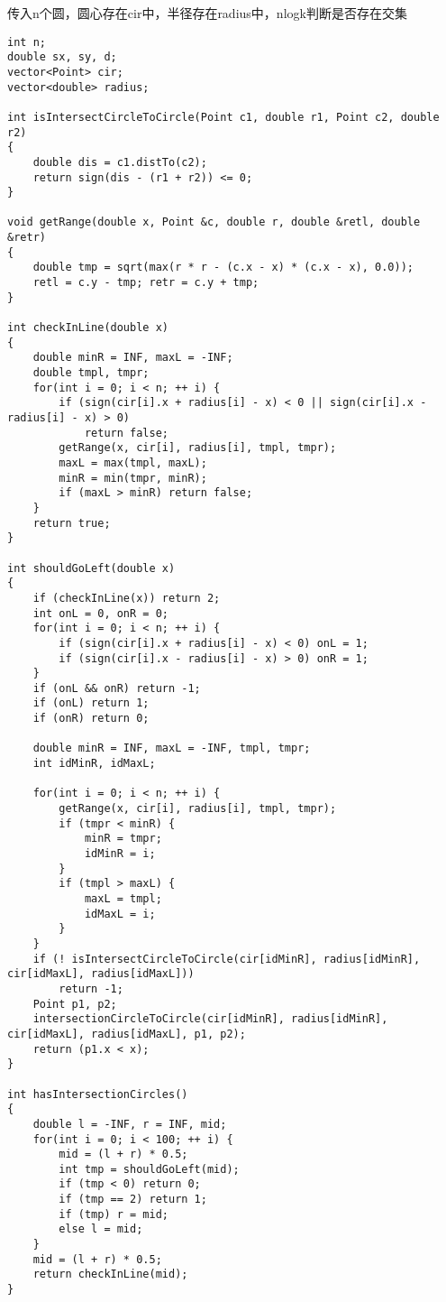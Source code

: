 传入n个圆，圆心存在cir中，半径存在radius中，nlogk判断是否存在交集
\begin{lstlisting}
int n;
double sx, sy, d;
vector<Point> cir;
vector<double> radius;

int isIntersectCircleToCircle(Point c1, double r1, Point c2, double r2)
{
	double dis = c1.distTo(c2);
	return sign(dis - (r1 + r2)) <= 0;
}

void getRange(double x, Point &c, double r, double &retl, double &retr)
{
	double tmp = sqrt(max(r * r - (c.x - x) * (c.x - x), 0.0));
	retl = c.y - tmp; retr = c.y + tmp;
}

int checkInLine(double x)
{
	double minR = INF, maxL = -INF;
	double tmpl, tmpr;
	for(int i = 0; i < n; ++ i) {
		if (sign(cir[i].x + radius[i] - x) < 0 || sign(cir[i].x - radius[i] - x) > 0) 
			return false;
		getRange(x, cir[i], radius[i], tmpl, tmpr);
		maxL = max(tmpl, maxL);
		minR = min(tmpr, minR);
		if (maxL > minR) return false;
	}
	return true;
}

int shouldGoLeft(double x)
{
	if (checkInLine(x)) return 2;
	int onL = 0, onR = 0;
	for(int i = 0; i < n; ++ i) {
		if (sign(cir[i].x + radius[i] - x) < 0) onL = 1;
		if (sign(cir[i].x - radius[i] - x) > 0) onR = 1;
	}
	if (onL && onR) return -1;
	if (onL) return 1;
	if (onR) return 0;

	double minR = INF, maxL = -INF, tmpl, tmpr;
	int idMinR, idMaxL;

	for(int i = 0; i < n; ++ i) {
		getRange(x, cir[i], radius[i], tmpl, tmpr);
		if (tmpr < minR) {
			minR = tmpr;
			idMinR = i;
		}
		if (tmpl > maxL) {
			maxL = tmpl;
			idMaxL = i;
		}
	}
	if (! isIntersectCircleToCircle(cir[idMinR], radius[idMinR], cir[idMaxL], radius[idMaxL])) 
		return -1;
	Point p1, p2;
	intersectionCircleToCircle(cir[idMinR], radius[idMinR], cir[idMaxL], radius[idMaxL], p1, p2); 
	return (p1.x < x);
}

int hasIntersectionCircles()
{
	double l = -INF, r = INF, mid;
	for(int i = 0; i < 100; ++ i) {
		mid = (l + r) * 0.5;
		int tmp = shouldGoLeft(mid);
		if (tmp < 0) return 0;
		if (tmp == 2) return 1;
		if (tmp) r = mid;
		else l = mid;
	}
	mid = (l + r) * 0.5;
	return checkInLine(mid);
}
\end{lstlisting}
